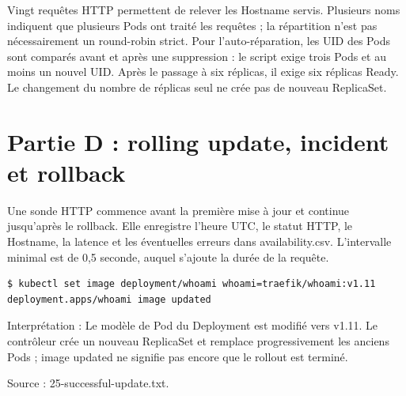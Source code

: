 \documentclass[11pt,a4paper]{article}
\begin{document}
Vingt requêtes HTTP permettent de relever les Hostname servis. Plusieurs noms indiquent que
plusieurs Pods ont traité les requêtes ; la répartition n'est pas nécessairement un round-robin strict.
Pour l'auto-réparation, les UID des Pods sont comparés avant et après une suppression : le
script exige trois Pods et au moins un nouvel UID. Après le passage à six réplicas, il exige
six réplicas Ready. Le changement du nombre de réplicas seul ne crée pas de nouveau ReplicaSet.

\clearpage
{}\section{Partie D : rolling update, incident et rollback}

Une sonde HTTP commence avant la première mise à jour et continue jusqu'après le rollback.
Elle enregistre l'heure UTC, le statut HTTP, le Hostname, la latence et les éventuelles erreurs
dans availability.csv. L'intervalle minimal est de 0,5 seconde, auquel s'ajoute la durée de la requête.

\par\medskip\noindent\begin{minipage}{\linewidth}
\par\vspace{4pt}\noindent\begin{minipage}{\linewidth}
\begin{Verbatim}[breaklines=true,breakanywhere=true,fontsize=\footnotesize,frame=single,framesep=8pt,rulecolor=\color{teal}]
$ kubectl set image deployment/whoami whoami=traefik/whoami:v1.11
deployment.apps/whoami image updated
\end{Verbatim}
\end{minipage}\par\vspace{6pt}

Interprétation : Le modèle de Pod du Deployment est modifié vers v1.11. Le contrôleur crée un nouveau ReplicaSet et remplace progressivement les anciens Pods ; image updated ne signifie pas encore que le rollout est terminé.

{\footnotesize\color{teal} Source : 25-successful-update.txt.\par}
\end{minipage}\par\medskip
\end{document}

